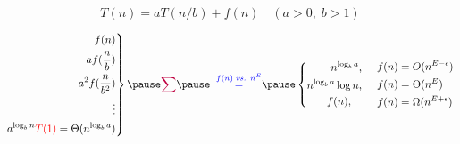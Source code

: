 
\begin{frame}{}
  \begin{center}
    {}
  \end{center}

\end{frame}

\begin{frame}{}
  \[
    T(n) = aT(n/b) + f(n) \quad (a > 0,\; b > 1) 
  \]

  \pause
  \begin{center}
    {}
  \end{center}

  \pause
  \vspace{0.30cm}
  \begin{equation*}
    \left.\begin{aligned}
      f(n) \\
      af(\frac{n}{b}) \\
      a^2f(\frac{n}{b^2}) \\
      \vdots \\
	  a^{\log_b n} \red{T(1)} = \Theta(n^{\log_b a})
    \end{aligned}\right\}
    \pause
    \purple{\sum} \pause\;\; \blue{\overset{f(n) \;\text{\it vs. } n^{E}}{=}} \pause
	\left\{\begin{aligned}
      n^{\log_b a},		 \\
      n^{\log_b a}\log n, 	 \\
      f(n),		   \quad \\
    \end{aligned}\right.
    \quad \left.\begin{aligned}
      f(n) &= O(n^{E-\epsilon}) \\
      f(n) &= \Theta(n^E) \\
      f(n) &= \Omega(n^{E+\epsilon}) 
    \end{aligned}\right.
  \end{equation*}

\end{frame}

